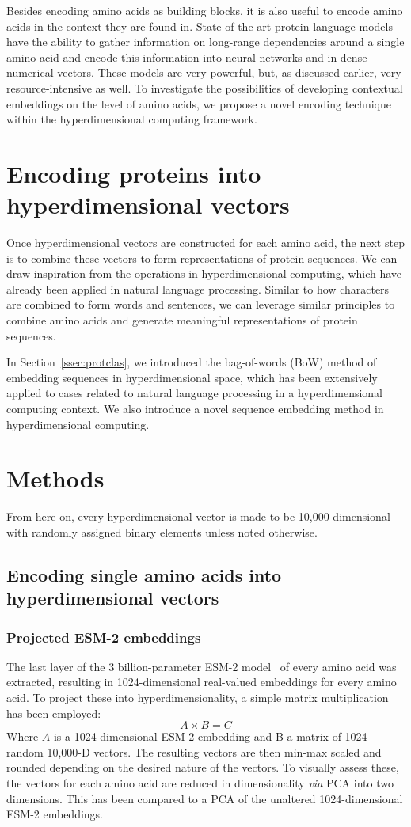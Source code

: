 Besides encoding amino acids as building blocks, it is also useful to encode amino acids in the context they are found in. State-of-the-art protein language models have the ability to gather information on long-range dependencies around a single amino acid and encode this information into neural networks and in dense numerical vectors. These models are very powerful, but, as discussed earlier, very resource-intensive as well. To investigate the possibilities of developing contextual embeddings on the level of amino acids, we propose a novel encoding technique within the hyperdimensional computing framework.

\section{Encoding proteins into hyperdimensional vectors}
Once hyperdimensional vectors are constructed for each amino acid, the next step is to combine these vectors to form representations of protein sequences. We can draw inspiration from the operations in hyperdimensional computing, which have already been applied in natural language processing. Similar to how characters are combined to form words and sentences, we can leverage similar principles to combine amino acids and generate meaningful representations of protein sequences.

In Section~\ref{ssec:protclas}, we introduced the bag-of-words (BoW) method of embedding sequences in hyperdimensional space, which has been extensively applied to cases related to natural language processing in a hyperdimensional computing context. We also introduce a novel sequence embedding method in hyperdimensional computing.

\section{Methods}
From here on, every hyperdimensional vector is made to be 10,000-dimensional with randomly assigned binary elements unless noted otherwise. 
\subsection{Encoding single amino acids into hyperdimensional vectors}
\subsubsection*{Projected ESM-2 embeddings}
The last layer of the 3 billion-parameter ESM-2 model~\cite{esm2} of every amino acid was extracted, resulting in 1024-dimensional real-valued embeddings for every amino acid. To project these into hyperdimensionality, a simple matrix multiplication has been employed: 
\[A \times B = C\]
Where $A$ is a 1024-dimensional ESM-2 embedding and B a matrix of 1024 random 10,000-D vectors. The resulting vectors are then min-max scaled and rounded depending on the desired nature of the vectors. To visually assess these, the vectors for each amino acid are reduced in dimensionality \textit{via} PCA into two dimensions. This has been compared to a PCA of the unaltered 1024-dimensional ESM-2 embeddings.
